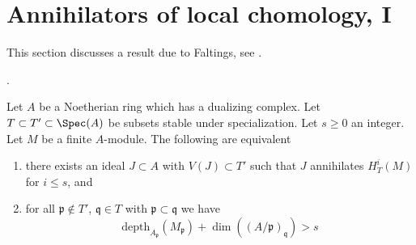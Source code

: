 \section{Annihilators of local chomology, I}
\label{section-annihilators}

\noindent
This section discusses a result due to Faltings, see
\cite{Faltings-annulators}.

\begin{proposition}
\label{proposition-annihilator}
\begin{reference}
\cite{Faltings-annulators}.
\end{reference}
Let $A$ be a Noetherian ring which has a dualizing complex.
Let $T \subset T' \subset \Spec(A)$ be subsets stable under
specialization. Let $s \geq 0$ an integer. Let $M$ be a finite $A$-module.
The following are equivalent
\begin{enumerate}
\item there exists an ideal $J \subset A$ with $V(J) \subset T'$
such that $J$ annihilates $H^i_T(M)$ for $i \leq s$, and
\item for all $\mathfrak p \not \in T'$,
$\mathfrak q \in T$ with $\mathfrak p \subset \mathfrak q$
we have
$$
\text{depth}_{A_\mathfrak p}(M_\mathfrak p) +
\dim((A/\mathfrak p)_\mathfrak q) > s
$$
\end{enumerate}
\end{proposition}

